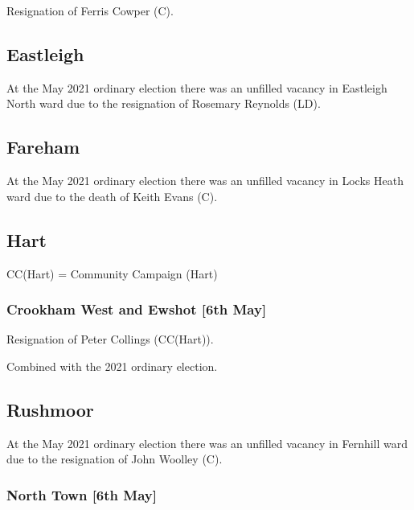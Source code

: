 \documentclass[a4paper,openany]{book}
\begin{document}
\begin{resultsiii}
Resignation of Ferris Cowper (C).

\subsection*{Eastleigh}

At the May 2021 ordinary election there was an unfilled vacancy in Eastleigh North ward due to the resignation of Rosemary Reynolds (LD).

\subsection*{Fareham}

At the May 2021 ordinary election there was an unfilled vacancy in Locks Heath ward due to the death of Keith Evans (C).

\subsection*{Hart}

CC(Hart) = Community Campaign (Hart)

\subsubsection*{Crookham West and Ewshot \hspace*{\fill}\nolinebreak[1]%
	\enspace\hspace*{\fill}
	[6th May]}


Resignation of Peter Collings (CC(Hart)).

Combined with the 2021 ordinary election.

\subsection*{Rushmoor}

At the May 2021 ordinary election there was an unfilled vacancy in Fernhill ward due to the resignation of John Woolley (C).

\subsubsection*{North Town \hspace*{\fill}\nolinebreak[1]%
	\enspace\hspace*{\fill}
	[6th May]}


\end{resultsiii}
\end{document}

